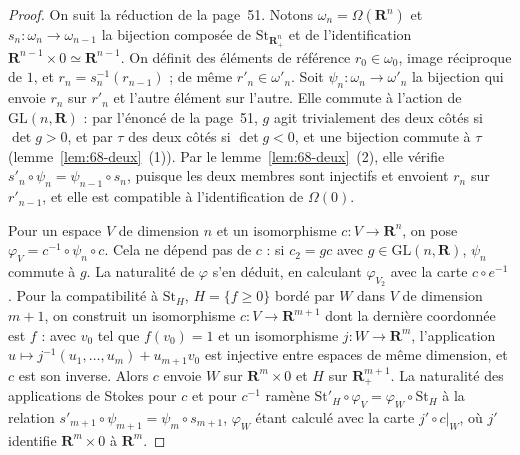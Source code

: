 \begin{proof}
On suit la réduction de la page~51. Notons $\omega_n = \Omega(\mathbf R^n)$ et $s_n : \omega_n \to \omega_{n-1}$ la bijection composée de $\mathrm{St}_{\mathbf R^n_+}$ et de l'identification $\mathbf R^{n-1} \times 0 \simeq \mathbf R^{n-1}$. On définit des éléments de référence $r_0 \in \omega_0$, image réciproque de $1$, et $r_n = s_n^{-1}(r_{n-1})$ ; de même $r'_n \in \omega'_n$. Soit $\psi_n : \omega_n \to \omega'_n$ la bijection qui envoie $r_n$ sur $r'_n$ et l'autre élément sur l'autre. Elle commute à l'action de $\mathrm{GL}(n, \mathbf R)$ : par l'énoncé de la page~51, $g$ agit trivialement des deux côtés si $\det g > 0$, et par $\tau$ des deux côtés si $\det g < 0$, et une bijection commute à $\tau$ (lemme~\ref{lem:68-deux}~(1)). Par le lemme~\ref{lem:68-deux}~(2), elle vérifie $s'_n \circ \psi_n = \psi_{n-1} \circ s_n$, puisque les deux membres sont injectifs et envoient $r_n$ sur $r'_{n-1}$, et elle est compatible à l'identification de $\Omega(0)$.

Pour un espace $V$ de dimension $n$ et un isomorphisme $c : V \to \mathbf R^n$, on pose $\varphi_V = c^{-1} \circ \psi_n \circ c$. Cela ne dépend pas de $c$ : si $c_2 = g c$ avec $g \in \mathrm{GL}(n, \mathbf R)$, $\psi_n$ commute à $g$. La naturalité de $\varphi$ s'en déduit, en calculant $\varphi_{V_2}$ avec la carte $c \circ e^{-1}$. Pour la compatibilité à $\mathrm{St}_H$, $H = \{f \geq 0\}$ bordé par $W$ dans $V$ de dimension $m + 1$, on construit un isomorphisme $c : V \to \mathbf R^{m+1}$ dont la dernière coordonnée est $f$ : avec $v_0$ tel que $f(v_0) = 1$ et un isomorphisme $j : W \to \mathbf R^m$, l'application $u \mapsto j^{-1}(u_1, \ldots, u_m) + u_{m+1} v_0$ est injective entre espaces de même dimension, et $c$ est son inverse. Alors $c$ envoie $W$ sur $\mathbf R^m \times 0$ et $H$ sur $\mathbf R^{m+1}_+$. La naturalité des applications de Stokes pour $c$ et pour $c^{-1}$ ramène $\mathrm{St}'_H \circ \varphi_V = \varphi_W \circ \mathrm{St}_H$ à la relation $s'_{m+1} \circ \psi_{m+1} = \psi_m \circ s_{m+1}$, $\varphi_W$ étant calculé avec la carte $j' \circ c|_W$, où $j'$ identifie $\mathbf R^m \times 0$ à $\mathbf R^m$.
\end{proof}

